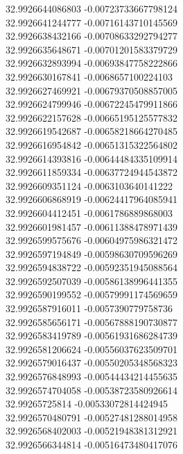 {32.9926644086803	-0.00723733667798124\\
32.9926641244777	-0.00716143710145569\\
32.9926638432166	-0.00708633292794277\\
32.9926635648671	-0.00701201583379729\\
32.9926632893994	-0.00693847758222866\\
32.9926630167841	-0.0068657100224103\\
32.9926627469921	-0.00679370508857005\\
32.9926624799946	-0.00672245479911866\\
32.9926622157628	-0.00665195125577832\\
32.9926619542687	-0.00658218664270485\\
32.9926616954842	-0.00651315322564802\\
32.9926614393816	-0.00644484335109914\\
32.9926611859334	-0.00637724944543872\\
32.9926609351124	-0.0063103640141222\\
32.9926606868919	-0.00624417964085941\\
32.9926604412451	-0.0061786889868003\\
32.9926601981457	-0.00611388478971439\\
32.9926599575676	-0.00604975986321472\\
32.9926597194849	-0.00598630709596269\\
32.9926594838722	-0.00592351945088564\\
32.9926592507039	-0.00586138996441355\\
32.9926590199552	-0.00579991174569659\\
32.9926587916011	-0.0057390779758736\\
32.9926585656171	-0.00567888190730877\\
32.9926583419789	-0.00561931686284739\\
32.9926581206624	-0.00556037623509701\\
32.9926579016437	-0.00550205348568323\\
32.9926576848993	-0.00544434214455635\\
32.9926574704058	-0.00538723580926614\\
32.99265725814	-0.00533072814424945\\
32.9926570480791	-0.00527481288014958\\
32.9926568402003	-0.00521948381312921\\
32.9926566344814	-0.00516473480417076\\
}

